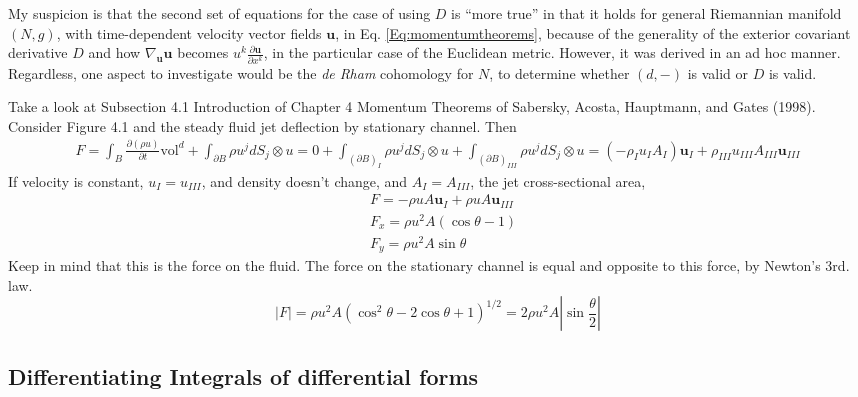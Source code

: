 \documentclass[twoside,landscape,10pt]{amsart}
\theoremstyle{plain}
\theoremstyle{definition}
\theoremstyle{remark}
\theoremstyle{remark}
\begin{document}
\begin{multicols*}{2}
My suspicion is that the second set of equations for the case of using $D$ is ``more true'' in that it holds for general Riemannian manifold $(N,g)$, with time-dependent velocity vector fields $\mathbf{u}$, in Eq. \ref{Eq:momentumtheorems}, because of the generality of the exterior covariant derivative $D$ and how $\nabla_{\mathbf{u}} \mathbf{u}$ becomes $u^k \frac{ \partial \mathbf{u}}{ \partial x^k}$, in the particular case of the Euclidean metric.  However, it was derived in an ad hoc manner.  Regardless, one aspect to investigate would be the \emph{de Rham} cohomology for $N$, to determine whether $(d,-)$ is valid or $D$ is valid.    

Take a look at Subsection 4.1 Introduction of Chapter 4 Momentum Theorems of Sabersky, Acosta, Hauptmann, and Gates (1998)\cite{SAHG1998}.  Consider Figure 4.1 and the steady fluid jet deflection by stationary channel.  Then
\[
\begin{gathered}
  F=\int_B \frac{ \partial ( \rho u)}{ \partial t} \text{vol}^d + \int_{\partial B} \rho u^j dS_j \otimes u = 0 + \int_{ (\partial B)_I} \rho u^j dS_j \otimes u + \int_{ (\partial B)_{III} } \rho u^j dS_j \otimes u = (-\rho_I u_I A_I) \mathbf{u}_I + \rho_{III} u_{III} A_{III} \mathbf{u}_{III}
\end{gathered}
\]
If velocity is constant, $u_I = u_{III}$, and density doesn't change, and $A_I = A_{III}$, the jet cross-sectional area, 
\[
\begin{aligned}
  & F = -\rho u A \mathbf{u}_I + \rho u A \mathbf{u}_{III} \\ 
  & F_x = \rho u^2 A (\cos{\theta}-1) \\ 
  & F_y = \rho u^2 A \sin{\theta}
\end{aligned}
\]
Keep in mind that this is the force on the fluid.  The force on the stationary channel is equal and opposite to this force, by Newton's 3rd. law.  
\[
|F| = \rho u^2 A ( \cos^2{\theta} - 2\cos{\theta} + 1 )^{1/2} = 2\rho u^2 A |\sin{ \frac{\theta}{2} } |
\]

\subsection{Differentiating Integrals of differential forms}


\end{multicols*}
\end{document}
